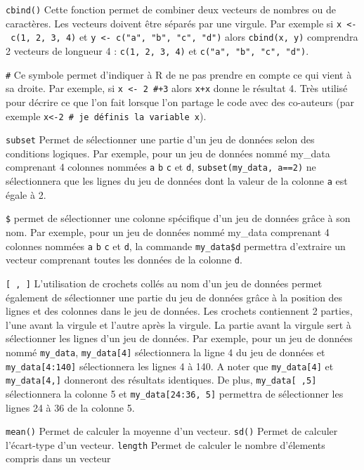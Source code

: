 \documentclass[
]{book}
\begin{document}
\texttt{cbind()} Cette fonction permet de combiner deux vecteurs de nombres ou de caractères. Les vecteurs doivent être séparés par une virgule. Par exemple si \texttt{x\ \textless{}-\ c(1,\ 2,\ 3,\ 4)} et \texttt{y\ \textless{}-\ c("a",\ "b",\ "c",\ "d")} alors \texttt{cbind(x,\ y)} comprendra 2 vecteurs de longueur 4 : \texttt{c(1,\ 2,\ 3,\ 4)} et \texttt{c("a",\ "b",\ "c",\ "d")}.

\texttt{\#} Ce symbole permet d'indiquer à R de ne pas prendre en compte ce qui vient à sa droite. Par exemple, si \texttt{x\ \textless{}-\ 2\ \#+3} alors \texttt{x+x} donne le résultat 4. Très utilisé pour décrire ce que l'on fait lorsque l'on partage le code avec des co-auteurs (par exemple \texttt{x\textless{}-2\ \#\ je\ définis\ la\ variable\ x}).

\texttt{subset} Permet de sélectionner une partie d'un jeu de données selon des conditions logiques. Par exemple, pour un jeu de données nommé my\_data comprenant 4 colonnes nommées \texttt{a} \texttt{b} \texttt{c} et \texttt{d}, \texttt{subset(my\_data,\ a==2)} ne sélectionnera que les lignes du jeu de données dont la valeur de la colonne \texttt{a} est égale à 2.

\texttt{\$} permet de sélectionner une colonne spécifique d'un jeu de données grâce à son nom. Par exemple, pour un jeu de données nommé my\_data comprenant 4 colonnes nommées \texttt{a} \texttt{b} \texttt{c} et \texttt{d}, la commande \texttt{my\_data\$d} permettra d'extraire un vecteur comprenant toutes les données de la colonne \texttt{d}.

\texttt{{[}\ ,\ {]}} L'utilisation de crochets collés au nom d'un jeu de données permet également de sélectionner une partie du jeu de données grâce à la position des lignes et des colonnes dans le jeu de données.
Les crochets contiennent 2 parties, l'une avant la virgule et l'autre après la virgule. La partie avant la virgule sert à sélectionner les lignes d'un jeu de données. Par exemple, pour un jeu de données nommé \texttt{my\_data}, \texttt{my\_data{[}4{]}} sélectionnera la ligne 4 du jeu de données et \texttt{my\_data{[}4:140{]}} sélectionnera les lignes 4 à 140. A noter que \texttt{my\_data{[}4{]}} et \texttt{my\_data{[}4,{]}} donneront des résultats identiques.
De plus, \texttt{my\_data{[}\ ,5{]}} sélectionnera la colonne 5 et \texttt{my\_data{[}24:36,\ 5{]}} permettra de sélectionner les lignes 24 à 36 de la colonne 5.

\texttt{mean()} Permet de calculer la moyenne d'un vecteur.
\texttt{sd()} Permet de calculer l'écart-type d'un vecteur.
\texttt{length} Permet de calculer le nombre d'élements compris dans un vecteur
\end{document}
